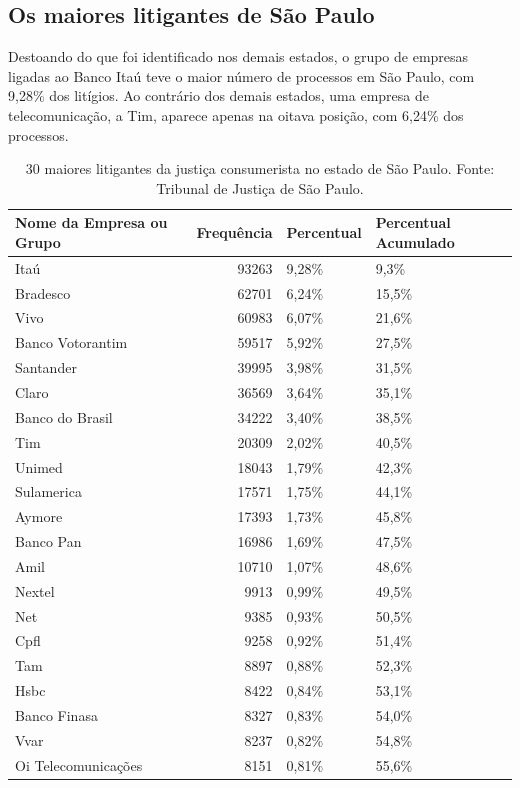 \documentclass[]{report}
\begin{document}
\subsection{Os maiores litigantes de São
Paulo}\label{os-maiores-litigantes-de-sao-paulo}

Destoando do que foi identificado nos demais estados, o grupo de
empresas ligadas ao Banco Itaú teve o maior número de processos em São
Paulo, com 9,28\% dos litígios. Ao contrário dos demais estados, uma
empresa de telecomunicação, a Tim, aparece apenas na oitava posição, com
6,24\% dos processos.

\begin{longtable}{lrll}
\caption{30 maiores litigantes da justiça consumerista no estado de São Paulo. Fonte: Tribunal de Justiça de São Paulo.} \\
  \hline
Nome da Empresa ou Grupo & Frequência & Percentual & Percentual Acumulado \\
  \hline
Itaú & 93263 & 9,28\% & 9,3\% \\
  Bradesco & 62701 & 6,24\% & 15,5\% \\
  Vivo & 60983 & 6,07\% & 21,6\% \\
  Banco
Votorantim & 59517 & 5,92\% & 27,5\% \\
  Santander & 39995 & 3,98\% & 31,5\% \\
  Claro & 36569 & 3,64\% & 35,1\% \\
  Banco do Brasil & 34222 & 3,40\% & 38,5\% \\
  Tim & 20309 & 2,02\% & 40,5\% \\
  Unimed & 18043 & 1,79\% & 42,3\% \\
  Sulamerica & 17571 & 1,75\% & 44,1\% \\
  Aymore & 17393 & 1,73\% & 45,8\% \\
  Banco Pan & 16986 & 1,69\% & 47,5\% \\
  Amil & 10710 & 1,07\% & 48,6\% \\
  Nextel & 9913 & 0,99\% & 49,5\% \\
  Net & 9385 & 0,93\% & 50,5\% \\
  Cpfl & 9258 & 0,92\% & 51,4\% \\
  Tam & 8897 & 0,88\% & 52,3\% \\
  Hsbc & 8422 & 0,84\% & 53,1\% \\
  Banco Finasa & 8327 & 0,83\% & 54,0\% \\
  Vvar & 8237 & 0,82\% & 54,8\% \\
  Oi
Telecomunicações & 8151 & 0,81\% & 55,6\% \\

\end{longtable}
\end{document}
